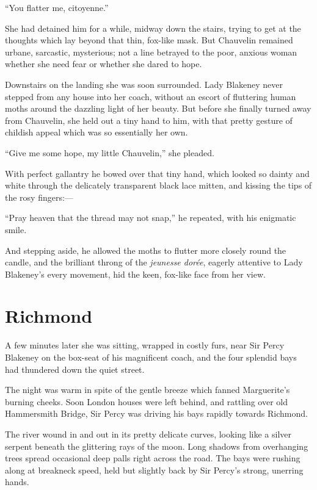 \documentclass[paper=5.5in:8.5in,BCOR=7mm,twoside,DIV=calc,12pt,usegeometry,chapterprefix,endperiod,headings=big]{scrbook}
\begin{document}
\enquote{You flatter me, citoyenne.}

She had detained him for a while, midway down the stairs, trying to get at the thoughts which lay beyond that thin, fox-like mask. But Chauvelin remained urbane, sarcastic, mysterious; not a line betrayed to the poor, anxious woman whether she need fear or whether she dared to hope.

Downstairs on the landing she was soon surrounded. Lady Blakeney never stepped from any house into her coach, without an escort of fluttering human moths around the dazzling light of her beauty. But before she finally turned away from Chauvelin, she held out a tiny hand to him, with that pretty gesture of childish appeal which was so essentially her own.

\enquote{Give me some hope, my little Chauvelin,} she pleaded.

With perfect gallantry he bowed over that tiny hand, which looked so dainty and white through the delicately transparent black lace mitten, and kissing the tips of the rosy fingers:---

\enquote{Pray heaven that the thread may not snap,} he repeated, with his enigmatic smile.

And stepping aside, he allowed the moths to flutter more closely round the candle, and the brilliant throng of the \textit{jeunesse dorée}, eagerly attentive to Lady Blakeney's every movement, hid the keen, fox-like face from her view.

\chapter{Richmond}
\lettrine[lines=4]{A}{} few minutes later she was sitting, wrapped in costly furs, near Sir Percy Blakeney on the box-seat of his magnificent coach, and the four splendid bays had thundered down the quiet street.

The night was warm in spite of the gentle breeze which fanned Marguerite's burning cheeks. Soon London houses were left behind, and rattling over old Hammersmith \newline Bridge, Sir Percy was driving his bays rapidly towards Richmond.

The river wound in and out in its pretty delicate curves, looking like a silver serpent beneath the glittering rays of the moon. Long shadows from overhanging trees spread occasional deep palls right across the road. The bays were rushing along at breakneck speed, held but slightly back by Sir Percy's strong, unerring hands.
\end{document}
